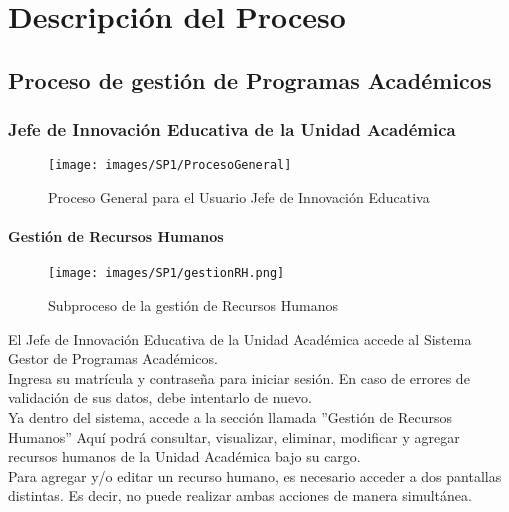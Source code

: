 \chapter{Descripción del Proceso}
    \section{Proceso de gestión de Programas Académicos}
        \subsection{Jefe de Innovación Educativa de la Unidad Académica}
        \begin{figure}[!hbtp]
        	\centering
        	\hypertarget{BPMNG}{\texttt{[image: images/SP1/ProcesoGeneral]}
        	\caption{Proceso General para el Usuario Jefe de Innovación Educativa}}
        	\label{BPMNG}
        \end{figure}
    
    	\subsubsection{Gestión de Recursos Humanos}
    	
        \begin{figure}[!hbtp]
        	\centering
        	\hypertarget{BPMNGRH}{\texttt{[image: images/SP1/gestionRH.png]}}
        	\caption{Subproceso de la gestión de Recursos Humanos}
        	\label{BPMNGRH}
        \end{figure}
        
        El Jefe de Innovación Educativa de la Unidad Académica accede al Sistema Gestor de Programas Académicos.\\
        
        Ingresa su matrícula y contraseña para iniciar sesión. En caso de errores de validación de sus datos, debe intentarlo de nuevo.\\
        
        Ya dentro del sistema, accede a la sección llamada ''Gestión de Recursos Humanos'' Aquí podrá consultar, visualizar, eliminar, modificar y agregar recursos humanos de la Unidad Académica bajo su cargo. \\
        
        Para agregar y/o editar un recurso humano, es necesario acceder a dos pantallas distintas. Es decir, no puede realizar ambas acciones de manera simultánea.\\
        
